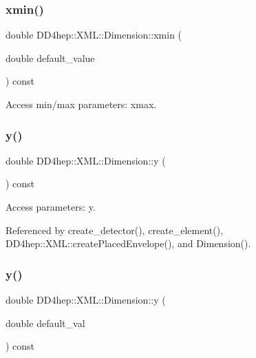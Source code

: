 \subsubsection{\texorpdfstring{xmin()}{xmin()}\hspace{0.1cm}{\footnotesize\ttfamily [2/2]}}
{\footnotesize\ttfamily double D\+D4hep\+::\+X\+M\+L\+::\+Dimension\+::xmin (\begin{DoxyParamCaption}\item[{double}]{default\+\_\+value }\end{DoxyParamCaption}) const}



Access min/max parameters\+: xmax. 

\hypertarget{struct_d_d4hep_1_1_x_m_l_1_1_dimension_a95de608bea42c9e3a235d4fbaf3ae3ae}{}\label{struct_d_d4hep_1_1_x_m_l_1_1_dimension_a95de608bea42c9e3a235d4fbaf3ae3ae} 
\subsubsection{\texorpdfstring{y()}{y()}\hspace{0.1cm}{\footnotesize\ttfamily [1/2]}}
{\footnotesize\ttfamily double D\+D4hep\+::\+X\+M\+L\+::\+Dimension\+::y (\begin{DoxyParamCaption}{ }\end{DoxyParamCaption}) const}



Access parameters\+: y. 



Referenced by create\+\_\+detector(), create\+\_\+element(), D\+D4hep\+::\+X\+M\+L\+::create\+Placed\+Envelope(), and Dimension().

\hypertarget{struct_d_d4hep_1_1_x_m_l_1_1_dimension_a267bde8c0a47b0b56aa4ff18b2f2f6b5}{}\label{struct_d_d4hep_1_1_x_m_l_1_1_dimension_a267bde8c0a47b0b56aa4ff18b2f2f6b5} 
\subsubsection{\texorpdfstring{y()}{y()}\hspace{0.1cm}{\footnotesize\ttfamily [2/2]}}
{\footnotesize\ttfamily double D\+D4hep\+::\+X\+M\+L\+::\+Dimension\+::y (\begin{DoxyParamCaption}\item[{double}]{default\+\_\+val }\end{DoxyParamCaption}) const}



